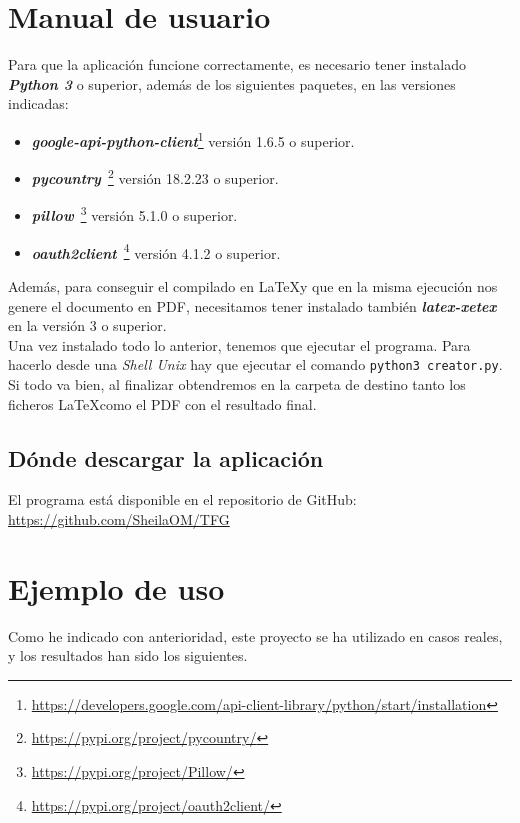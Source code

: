 \documentclass[a4paper, 12pt]{book}
\begin{document}

\cleardoublepage
\appendix
\chapter{Manual de usuario}
\label{app:manual}
Para que la aplicación funcione correctamente, es necesario tener instalado \textbf{\textit{Python 3}} o superior, además de los siguientes paquetes, en las versiones indicadas:
\begin{itemize}
	\item \textbf{\textit{google-api-python-client}}\footnote{\url{https://developers.google.com/api-client-library/python/start/installation}} versión 1.6.5 o superior.
	\item \textbf{\textit{pycountry}}~\footnote{\url{https://pypi.org/project/pycountry/}} versión 18.2.23 o superior.
	\item \textbf{\textit{pillow}}~\footnote{\url{https://pypi.org/project/Pillow/}} versión 5.1.0 o superior.
	\item \textbf{\textit{oauth2client}}~\footnote{\url{https://pypi.org/project/oauth2client/}} versión 4.1.2 o superior.
\end{itemize}

Además, para conseguir el compilado en \LaTeX y que en la misma ejecución nos genere el documento en PDF, necesitamos tener instalado también \textbf{\textit{latex-xetex}} en la versión 3 o superior.\\

Una vez instalado todo lo anterior, tenemos que ejecutar el programa. Para hacerlo desde una \textit{Shell Unix} hay que ejecutar el comando \texttt{python3 creator.py}. Si todo va bien, al finalizar obtendremos en la carpeta de destino tanto los ficheros \LaTeX como el PDF con el resultado final.

\section{Dónde descargar la aplicación}
\label{sec:descarga_aplicacion}
El programa está disponible en el repositorio de GitHub:\\
\url{https://github.com/SheilaOM/TFG}


\cleardoublepage
\chapter{Ejemplo de uso}
\label{app:ejemplos}
Como he indicado con anterioridad, este proyecto se ha utilizado en casos reales, y los resultados han sido los siguientes.
\end{document}
